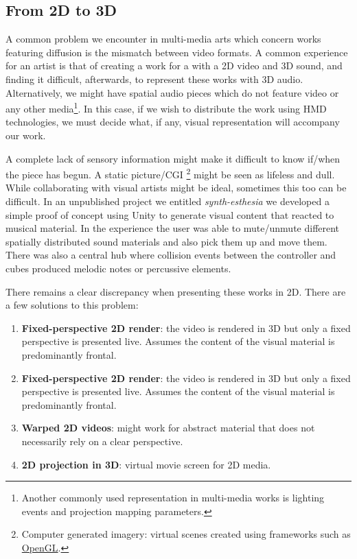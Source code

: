 \subsection{From 2D to 3D}

A common problem we encounter in multi-media arts which concern works featuring diffusion is the mismatch between video formats. A common experience for an artist is that of creating a work for a with a 2D video and 3D sound, and finding it difficult, afterwards, to represent these works with 3D audio. Alternatively, we might have spatial audio pieces which do not feature video or any other media\footnote{Another commonly used representation in multi-media works is lighting events and projection mapping parameters.}. In this case, if we wish to distribute the work using HMD technologies, we must decide what, if any, visual representation will accompany our work. 

A complete lack of sensory information might make it difficult to know if/when the piece has begun. A static picture/CGI \footnote{Computer generated imagery: virtual scenes created using frameworks such as \href{https://www.opengl.org/}{OpenGL}.} might be seen as lifeless and dull. While collaborating with visual artists might be ideal, sometimes this too can be difficult. In an unpublished project we entitled \textit{synth-esthesia} we developed a simple proof of concept using Unity to generate visual content that reacted to musical material. In the experience the user was able to mute/unmute different spatially distributed sound materials and also pick them up and move them. There was also a central hub where collision events between the controller and cubes produced melodic notes or percussive elements. 


There remains a clear discrepancy when presenting these works in 2D. There are a few solutions to this problem:
\begin{enumerate}
    \item \textbf{Fixed-perspective 2D render}: the video is rendered in 3D but only a fixed perspective is presented live. Assumes the content of the visual material is predominantly frontal. 
    \item \textbf{Fixed-perspective 2D render}: the video is rendered in 3D but only a fixed perspective is presented live. Assumes the content of the visual material is predominantly frontal. 
    \item \textbf{Warped 2D videos}: might work for abstract material that does not necessarily rely on a clear perspective. 
    \item \textbf{2D projection in 3D}: virtual movie screen for 2D media. 
\end{enumerate}

